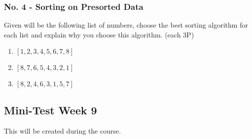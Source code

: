 \documentclass[10pt, oneside]{article}
\theoremstyle{remark}
\begin{document}
\subsubsection{No. 4 - Sorting on Presorted Data}
Given will be the following list of numbers, choose the best sorting algorithm for each list and explain why you choose this algorithm. (each $3$P)
\begin{enumerate}
  \item $[1, 2, 3, 4, 5, 6, 7, 8]$
  \item $[8, 7, 6, 5, 4, 3, 2, 1]$
  \item $[8, 2, 4, 6, 3, 1, 5, 7]$
\end{enumerate}

\subsection{Mini-Test Week 9}
This will be created during the course.
\end{document}
